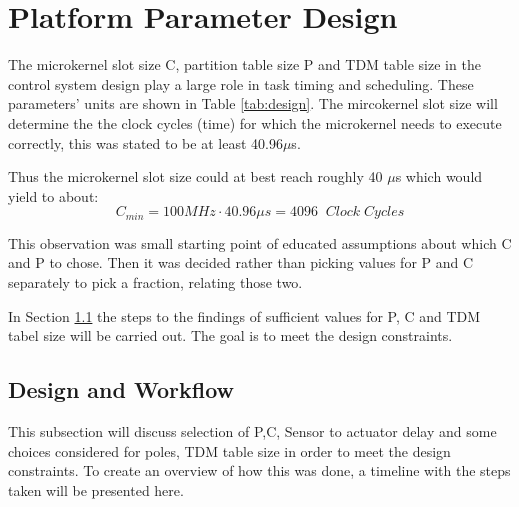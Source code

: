 \section{Platform Parameter Design}
\label{sec:platform}

The microkernel slot size C, partition table size P and TDM table size in the control system design play a large role in task timing and scheduling. These parameters' units are shown in Table \ref{tab:design}. The mircokernel slot size will determine the the clock cycles (time) for which the microkernel needs to execute correctly, this was stated to be at least 40.96$\mu$s.

Thus the microkernel slot size could at best reach roughly 40 $\mu$s which would yield to about: $$ C_{min} = 100MHz \cdot 40.96 \mu s = 4096 \;\;Clock \; Cycles$$

This observation was small starting point of educated assumptions about which C and P to chose. Then it was decided rather than picking values for P and C separately to pick a fraction, relating those two. 

In Section \ref{sec:steps} the steps to the findings of sufficient values for P, C and TDM tabel size will be carried out. The goal is to meet the design constraints.

\subsection{Design and Workflow}
\label{sec:steps}
This subsection will discuss selection of P,C, Sensor to actuator delay and some choices considered for poles, TDM table size in order to meet the design constraints. To create an overview of how this was done, a timeline with the steps taken will be presented here.

